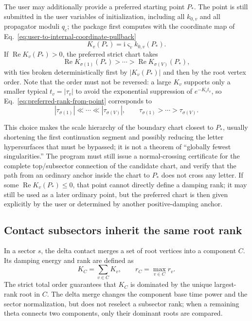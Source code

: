 \documentclass[11pt,a4paper]{article}
\newcommand{\ii}{\mathrm i}
\begin{document}
The user may additionally provide a preferred starting point $P_*$. The point is still submitted in the user variables of initialization, including all $k_{0,v}$ and all propagator moduli $q_e$; the package first computes with the coordinate map of Eq.~\eqref{eq:user-to-internal-coordinate-pullback}
\begin{equation}
 K_v(P_*)=\ii\varsigma_vk_{0,v}(P_*).
\end{equation}
If $\operatorname{Re}K_v(P_*)>0$, the preferred strict chart takes
\begin{equation}
 \operatorname{Re}K_{\sigma(1)}(P_*)>\cdots>
 \operatorname{Re}K_{\sigma(V)}(P_*),
 \label{eq:preferred-rank-from-point}
\end{equation}
with ties broken deterministically first by $|K_v(P_*)|$ and then by the root vertex order. Note that the order must not be reversed: a large $K_v$ supports only a smaller typical $t_v=|\tau_v|$ to avoid the exponential suppression of $e^{-K_vt_v}$, so Eq.~\eqref{eq:preferred-rank-from-point} corresponds to
\begin{equation}
 |\tau_{\sigma(1)}|\ll\cdots\ll|\tau_{\sigma(V)}|,
 \qquad
 \tau_{\sigma(1)}>\cdots>\tau_{\sigma(V)}.
\end{equation}

This choice makes the scale hierarchy of the boundary chart closest to $P_*$, usually shortening the first continuation segment and possibly reducing the letter hypersurfaces that must be bypassed; it is not a theorem of ``globally fewest singularities.'' The program must still issue a normal-crossing certificate for the complete top/subsector connection of the candidate chart, and verify that the path from an ordinary anchor inside the chart to $P_*$ does not cross any letter. If some $\operatorname{Re}K_v(P_*)\leq0$, that point cannot directly define a damping rank; it may still be used as a later ordinary point, but the preferred chart is then given explicitly by the user or determined by another positive-damping anchor.

\subsection{Contact subsectors inherit the same root rank}

In a sector $s$, the delta contact merges a set of root vertices into a component $C$. Its damping energy and rank are defined as
\begin{equation}
 K_C=\sum_{v\in C}K_v,
 \qquad
 r_C=\max_{v\in C}r_v.
 \label{eq:component-energy-rank}
\end{equation}
The strict total order guarantees that $K_C$ is dominated by the unique largest-rank root in $C$. The delta merge changes the component base time power and the sector normalization, but does not reselect a subsector rank; when a remaining theta connects two components, only their dominant roots are compared.
\end{document}
